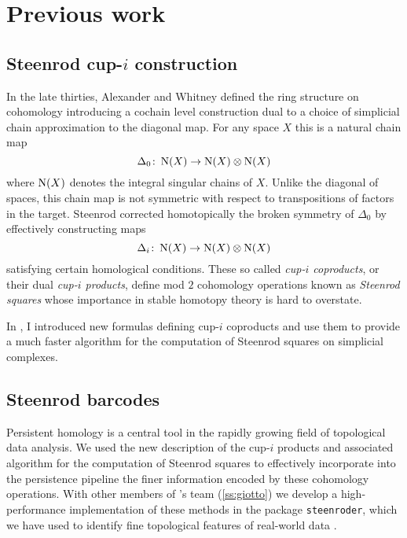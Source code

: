 
\section{Previous work} \label{s:past}

\subsection{Steenrod cup-$i$ construction} \label{ss:cup-i}

In the late thirties, Alexander and Whitney defined the ring structure on cohomology introducing a cochain level construction dual to a choice of simplicial chain approximation to the diagonal map.
For any space $X$ this is a natural chain map
\[
\Delta_0 \colon \operatorname{N}(X) \to \operatorname{N}(X) \otimes \operatorname{N}(X)
\]
where $\operatorname{N}(X)$ denotes the integral singular chains of $X$.
Unlike the diagonal of spaces, this chain map is not symmetric with respect to transpositions of factors in the target.
Steenrod \cite{steenrod1947products} corrected homotopically the broken symmetry of $\Delta_0$ by effectively constructing maps
\begin{equation*}
\Delta_i \colon \operatorname{N}(X) \to \operatorname{N}(X) \otimes \operatorname{N}(X)
\end{equation*}
satisfying certain homological conditions.
These so called \textit{cup-$i$ coproducts}, or their dual \textit{cup-$i$ products}, define mod $2$ cohomology operations known as \textit{Steenrod squares} whose importance in stable homotopy theory is hard to overstate.

In \cite{medina2023fast_sq}, I introduced new formulas defining cup-$i$ coproducts and use them to provide a much faster algorithm for the computation of Steenrod squares on simplicial complexes.

\subsection{Steenrod barcodes}

Persistent homology is a central tool in the rapidly growing field of topological data analysis.
We used the new description of the cup-$i$ products and associated algorithm for the computation of Steenrod squares to effectively incorporate into the persistence pipeline the finer information encoded by these cohomology operations.
With other members of \giottoTDA's team (\cref{ss:giotto}) we develop a high-performance implementation of these methods in the package \texttt{steenroder}, which we have used to identify fine topological features of real-world data \cite{medina2022per_st}.

